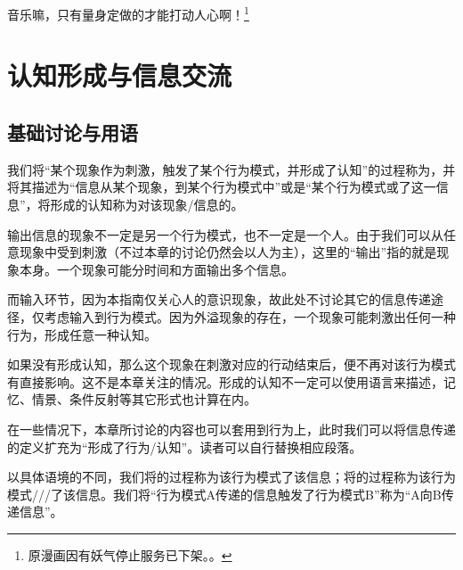 \begin{savequote}[450pt] %
    \fontsize{8pt}{8pt} %
    音乐嘛，只有量身定做的才能打动人心啊！\footnote{原漫画因有妖气停止服务已下架。。}
\end{savequote}

\chapter{认知形成与信息交流}

\addtocounter{section}{-1}
\section{基础讨论与用语}
我们将“某个现象作为刺激，触发了某个行为模式，并形成了认知”的过程称为，并将其描述为“信息从某个现象，到某个行为模式中”或是“某个行为模式或了这一信息”，将形成的认知称为对该现象/信息的。
\begin{explain}
输出信息的现象不一定是另一个行为模式，也不一定是一个人。由于我们可以从任意现象中受到刺激（不过本章的讨论仍然会以人为主），这里的“输出”指的就是现象本身。一个现象可能分时间和方面输出多个信息。

而输入环节，因为本指南仅关心人的意识现象，故此处不讨论其它的信息传递途径，仅考虑输入到行为模式。因为外溢现象的存在，一个现象可能刺激出任何一种行为，形成任意一种认知。

如果没有形成认知，那么这个现象在刺激对应的行动结束后，便不再对该行为模式有直接影响。这不是本章关注的情况。形成的认知不一定可以使用语言来描述，记忆、情景、条件反射等其它形式也计算在内。

在一些情况下，本章所讨论的内容也可以套用到行为上，此时我们可以将信息传递的定义扩充为“形成了行为/认知”。读者可以自行替换相应段落。
\end{explain}
以具体语境的不同，我们将的过程称为该行为模式了该信息；将的过程称为该行为模式///了该信息。我们将“行为模式A传递的信息触发了行为模式B”称为“A向B传递信息”。

